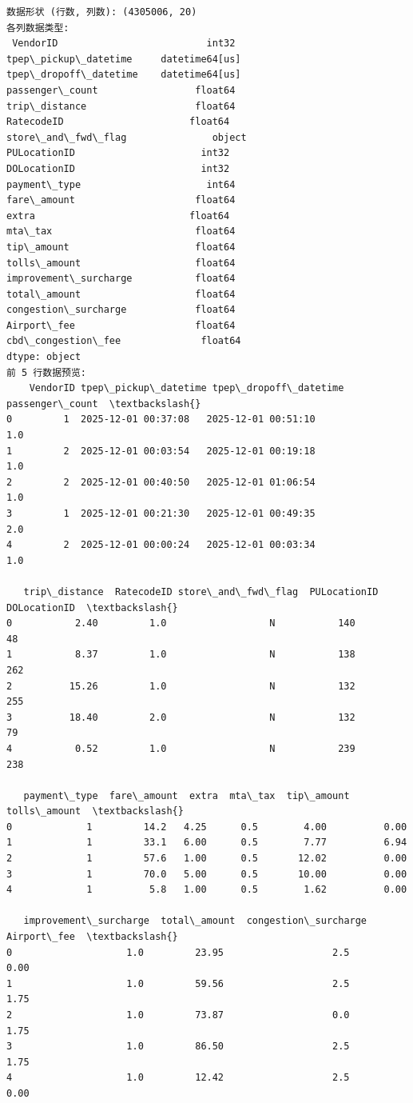 \documentclass[11pt]{article}
\begin{document}
    \begin{Verbatim}[commandchars=\\\{\}]
数据形状 (行数, 列数): (4305006, 20)
各列数据类型:
 VendorID                          int32
tpep\_pickup\_datetime     datetime64[us]
tpep\_dropoff\_datetime    datetime64[us]
passenger\_count                 float64
trip\_distance                   float64
RatecodeID                      float64
store\_and\_fwd\_flag               object
PULocationID                      int32
DOLocationID                      int32
payment\_type                      int64
fare\_amount                     float64
extra                           float64
mta\_tax                         float64
tip\_amount                      float64
tolls\_amount                    float64
improvement\_surcharge           float64
total\_amount                    float64
congestion\_surcharge            float64
Airport\_fee                     float64
cbd\_congestion\_fee              float64
dtype: object
前 5 行数据预览:
    VendorID tpep\_pickup\_datetime tpep\_dropoff\_datetime  passenger\_count  \textbackslash{}
0         1  2025-12-01 00:37:08   2025-12-01 00:51:10              1.0
1         2  2025-12-01 00:03:54   2025-12-01 00:19:18              1.0
2         2  2025-12-01 00:40:50   2025-12-01 01:06:54              1.0
3         1  2025-12-01 00:21:30   2025-12-01 00:49:35              2.0
4         2  2025-12-01 00:00:24   2025-12-01 00:03:34              1.0

   trip\_distance  RatecodeID store\_and\_fwd\_flag  PULocationID  DOLocationID  \textbackslash{}
0           2.40         1.0                  N           140            48
1           8.37         1.0                  N           138           262
2          15.26         1.0                  N           132           255
3          18.40         2.0                  N           132            79
4           0.52         1.0                  N           239           238

   payment\_type  fare\_amount  extra  mta\_tax  tip\_amount  tolls\_amount  \textbackslash{}
0             1         14.2   4.25      0.5        4.00          0.00
1             1         33.1   6.00      0.5        7.77          6.94
2             1         57.6   1.00      0.5       12.02          0.00
3             1         70.0   5.00      0.5       10.00          0.00
4             1          5.8   1.00      0.5        1.62          0.00

   improvement\_surcharge  total\_amount  congestion\_surcharge  Airport\_fee  \textbackslash{}
0                    1.0         23.95                   2.5         0.00
1                    1.0         59.56                   2.5         1.75
2                    1.0         73.87                   0.0         1.75
3                    1.0         86.50                   2.5         1.75
4                    1.0         12.42                   2.5         0.00


\end{Verbatim}
\end{document}

